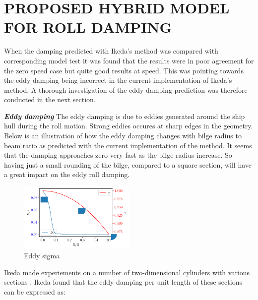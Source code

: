 \section*{PROPOSED HYBRID MODEL FOR ROLL DAMPING}\label{sec:hybrid_damping_model}


When the damping predicted with Ikeda's method was compared with corresponding model test it was found that the results were in poor agreement for the zero speed case but quite good results at speed. This was pointing towards the eddy damping being incorrect in the current
implementation of Ikeda's method. A thorough investigation of the eddy damping prediction was therefore conducted in the next section.

\textbf{\textit{Eddy damping}} The eddy damping is due to eddies generated around the ship hull during the roll motion. Strong eddies occures at sharp edges in the geometry. Below is an illustration of how the eddy damping changes with bilge radius to beam ratio as predicted with the current implementation of the method. It seems that the damping approaches zero very fast as the bilge radius increase. So having just a small rounding of the bilge, compared to a square section, will have a great impact on the eddy roll damping.

    \begin{figure}
        \begin{center}\includegraphics[width = 0.5\textwidth]{figures/eddy_sigma.pdf}\end{center}
        \vspace{-1cm}
        \caption{Eddy sigma}
        \label{fig:eddy_sigma}
    \end{figure}
    
Ikeda made experiements on a number of two-dimensional cylinders with various sections \cite{7505983/4AFVVGNT}. Ikeda found that the eddy damping per unit length of these sections can be expressed as: 

